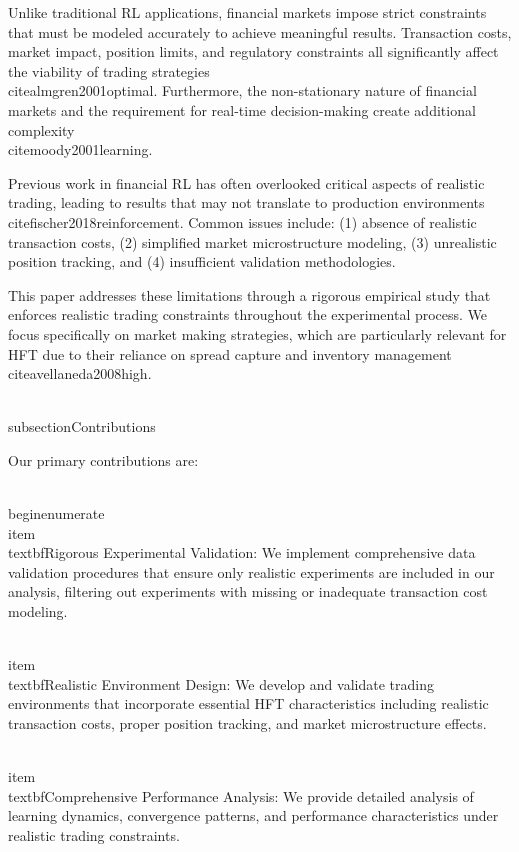 \documentclass[11pt,a4paper]{article}
\begin{document}
Unlike traditional RL applications, financial markets impose strict constraints that must be modeled accurately to achieve meaningful results. Transaction costs, market impact, position limits, and regulatory constraints all significantly affect the viability of trading strategies~\\cite{almgren2001optimal}. Furthermore, the non-stationary nature of financial markets and the requirement for real-time decision-making create additional complexity~\\cite{moody2001learning}.

Previous work in financial RL has often overlooked critical aspects of realistic trading, leading to results that may not translate to production environments~\\cite{fischer2018reinforcement}. Common issues include: (1) absence of realistic transaction costs, (2) simplified market microstructure modeling, (3) unrealistic position tracking, and (4) insufficient validation methodologies.

This paper addresses these limitations through a rigorous empirical study that enforces realistic trading constraints throughout the experimental process. We focus specifically on market making strategies, which are particularly relevant for HFT due to their reliance on spread capture and inventory management~\\cite{avellaneda2008high}.

\\subsection{Contributions}

Our primary contributions are:

\\begin{enumerate}
\\item \\textbf{Rigorous Experimental Validation}: We implement comprehensive data validation procedures that ensure only realistic experiments are included in our analysis, filtering out experiments with missing or inadequate transaction cost modeling.

\\item \\textbf{Realistic Environment Design}: We develop and validate trading environments that incorporate essential HFT characteristics including realistic transaction costs, proper position tracking, and market microstructure effects.

\\item \\textbf{Comprehensive Performance Analysis}: We provide detailed analysis of learning dynamics, convergence patterns, and performance characteristics under realistic trading constraints.
\end{document}
